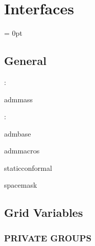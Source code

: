 
\section{Interfaces} 


\parskip = 0pt

\vspace{3mm} \subsection*{General}

: 

admmass
\vspace{2mm}

: 

admbase

admmacros

staticconformal

spacemask
\vspace{2mm}
\subsection*{Grid Variables}
\vspace{5mm}\subsubsection{PRIVATE GROUPS}

\vspace{5mm}

